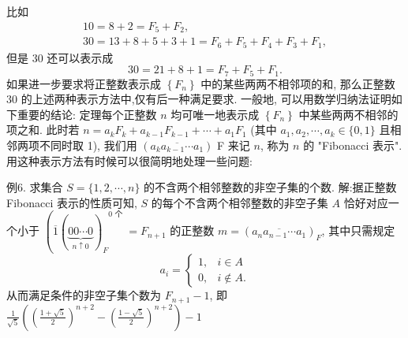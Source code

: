 比如
$$
\begin{gathered}
10=8+2=F_5+F_2, \\
30=13+8+5+3+1=F_6+F_5+F_4+F_3+F_1,
\end{gathered}
$$
但是 30 还可以表示成
$$
30=21+8+1=F_7+F_5+F_1 .
$$
如果进一步要求将正整数表示成 $\left\{F_n\right\}$ 中的某些两两不相邻项的和, 那么正整数 30 的上述两种表示方法中,仅有后一种满足要求.
一般地, 可以用数学归纳法证明如下重要的结论:
定理每个正整数 $n$ 均可唯一地表示成 $\left\{F_n\right\}$ 中某些两两不相邻的项之和.
此时若 $n=a_k F_k+a_{k-1} F_{k-1}+\cdots+a_1 F_1$ (其中 $a_1, a_2, \cdots, a_k \in\{0,1\}$ 且相邻两项不同时取 1), 我们用 $\left(\overline{a_k a_{k-1} \cdots a_1}\right)$ F 来记 $n$, 称为 $n$ 的 "Fibonacci 表示".
用这种表示方法有时候可以很简明地处理一些问题:



例6. 求集合 $S=\{1,2, \cdots, n\}$ 的不含两个相邻整数的非空子集的个数.
解:据正整数 Fibonacci 表示的性质可知, $S$ 的每个不含两个相邻整数的非空子集 $A$ 恰好对应一个小于 $\left({\overline{1}(\underbrace{00 \cdots 0}_{n \uparrow 0})_F}^{0 \text { 个 }}=F_{n+1}\right.$ 的正整数 $m= \left(\overline{a_n a_{n-1} \cdots a_1}\right)_F$, 其中只需规定
$$
a_i= \begin{cases}1, & i \in A \\ 0, & i \notin A .\end{cases}
$$
从而满足条件的非空子集个数为 $F_{n+1}-1$, 即 $\frac{1}{\sqrt{5}}\left(\left(\frac{1+\sqrt{5}}{2}\right)^{n+2}- \left(\frac{1-\sqrt{5}}{2}\right)^{n+2}\right)-1$



